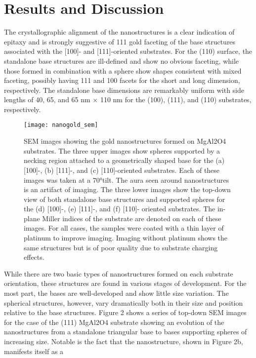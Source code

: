 \section{Results and Discussion}
The crystallographic alignment of
the nanostructures is a clear indication of epitaxy and
is strongly suggestive of {111} gold faceting of the base
structures associated with the [100]- and [111]-oriented
substrates. For the (110) surface, the standalone base
structures are ill-defined and show no obvious faceting, while
those formed in combination with a sphere show shapes
consistent with mixed faceting, possibly having {111} and
{100} facets for the short and long dimension, respectively.
The standalone base dimensions are remarkably uniform with
side lengths of 40, 65, and 65 nm $\times$ 110 nm for the (100),
(111), and (110) substrates, respectively.
\begin{figure}
    \centering
    \texttt{[image: nanogold\_sem]}
    \caption{\label{fig:nanogold_sem}SEM images showing the gold nanostructures formed
        on MgAl2O4 substrates. The three upper images show spheres
        supported by a necking region attached to a geometrically shaped
        base for the (a) [100]-, (b) [111]-, and (c) [110]-oriented substrates.
        Each of these images was taken at a 70°\degree tilt. The aura seen around
        nanostructures is an artifact of imaging. The three lower images
        show the top-down view of both standalone base structures and
        supported spheres for the (d) [100]-, (e) [111]-, and (f) [110]-
        oriented substrates. The in-plane Miller indices of the substrate are
        denoted on each of these images. For all cases, the samples were
        coated with a thin layer of platinum to improve imaging. Imaging
        without platinum shows the same structures but is of poor quality
        due to substrate charging effects.}
\end{figure}
While there are two basic types of nanostructures formed
on each substrate orientation, these structures are found in
various stages of development. For the most part, the bases
are well-developed and show little size variation. The
spherical structures, however, vary dramatically both in their
size and position relative to the base structures. Figure 2
shows a series of top-down SEM images for the case of the
(111) MgAl2O4 substrate showing an evolution of the
nanostructures from a standalone triangular base to bases
supporting spheres of increasing size. Notable is the fact that
the nanostructure, shown in Figure 2b, manifests itself as a
